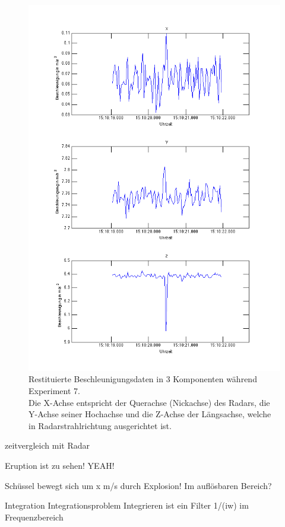 \documentclass[12pt,a4paper]{scrartcl}
\begin{document}
\begin{figure}[H]
\centering
\includegraphics[scale=.5]{wakiki/firstexample2.png}
\caption{Restituierte Beschleunigungsdaten in 3 Komponenten während Experiment 7.\\ Die X-Achse entspricht der Querachse (Nickachse) des Radars, die Y-Achse seiner Hochachse und die Z-Achse der Längsachse, welche in Radarstrahlrichtung ausgerichtet ist. }
\label{firstexample}
\end{figure}



zeitvergleich mit Radar

Eruption ist zu sehen! YEAH!



Schüssel bewegt sich um x m/s durch Explosion! Im auflösbaren Bereich? 


Integration Integrationsproblem
Integrieren ist ein Filter  1/(iw) im Frequenzbereich
\end{document}
